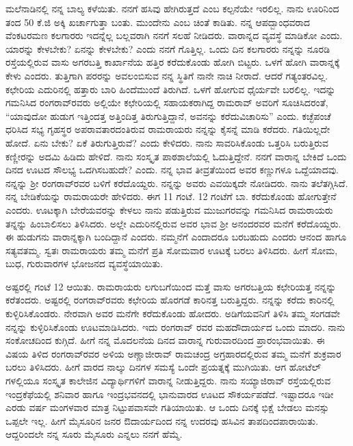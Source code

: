 {ಮಲೆನಾಡಿನಲ್ಲಿ ನನ್ನ ಬಾಲ್ಯ ಕಳೆಯಿತು.  ನನಗೆ ಹಸಿವು ಹೇಗಿರುತ್ತದೆ ಎಂಬ ಕಲ್ಪನೆಯೇ ಇರಲಿಲ್ಲ.  ನಾನು ಊರಿನಿಂದ  ತಂದ 50 ಕೆ.ಜಿ ಅಕ್ಕಿ ಖರ್ಚಾಗುತ್ತಾ ಬಂತು.  ಮುಂದೇನು ಎಂಬ ಚಿಂತೆ ಕಾಡಿತು.  ನನ್ನ ಆಪದ್ಬಾಂಧವರಾದ ವೆಂಕಟರಮಣ ಕಲ\-ಗಾರರು ಇದನ್ನೆಲ್ಲ ಬಲ್ಲವರಾಗಿ ನನಗೆ ಸಲಹೆ ನೀಡಿದರು.  ವಾರಾನ್ನದ ವ್ಯವಸ್ಥೆ ಮಾಡಿಕೋ ಎಂದು.  ಯಾರನ್ನು ಕೇಳಬೇಕು? ಏನನ್ನು ಕೇಳಬೇಕು? ಎಂದು ನನಗೆ ಗೊತ್ತಿಲ್ಲ.  ಒಂದು ದಿನ ಕಲಗಾರರು ನನ್ನನ್ನು ನೂರಡಿ ರಸ್ತೆಯಲ್ಲಿರುವ ವಾಸು ಅಗರಬತ್ತಿ ಕಾರ್ಖಾನೆಯ ಹತ್ತಿರ ಕರೆದುಕೊಂಡು ಹೋಗಿ ಬಿಟ್ಟರು.  ಒಳಗೆ ಹೋಗಿ ವಾರಾನ್ನಕ್ಕೆ ಕೇಳು ಎಂದರು.  ತುತ್ತಿಗಾಗಿ ಪರರನ್ನು ಅವಲಂಬಿಸುವ ನನ್ನ ಸ್ಥಿತಿಗೆ ನಾನೇ ನಾಚಿ ನೀರಾದೆ.  ಆದರೆ ಗತ್ಯಂತರವಿಲ್ಲ.  ಕಛೇರಿಯ ಎದುರಿನಲ್ಲಿ ಹತ್ತಾರು ಬಾರಿ ಹಿಂದೆಮುಂದೆ \hbox{ತಿರುಗಿದೆ.}  ಒಳಗೆ ಹೋಗುವ ಧೈರ್ಯವೇ ಬರಲಿಲ್ಲ.  ಇದನ್ನು ಗಮನಿಸಿದ ರಂಗರಾವ್‍ರವರು ಅಲ್ಲಿಯೇ ಕಛೇರಿಯಲ್ಲಿ ಸಹಾಯಕರಾಗಿದ್ದ ರಾಮರಾವ್ ಅವರಿಗೆ ಸೂಚಿಸಿದರಂತೆ,  “ಯಾವುದೋ ಹುಡುಗ ಇತ್ತಿಂದತ್ತ ಅತ್ತಿಂದಿತ್ತ  ತಿರುಗುತ್ತಿದ್ದಾನೆ, ಅವನನ್ನು ಕರೆದು\break ವಿಚಾರಿಸು” ಎಂದು.  ಕಚ್ಛೆಪಂಚೆ ಧರಿಸಿದ ಸಭ್ಯ ಗೃಹಸ್ಥರ ಅಪರಾವತಾರದಂತಿರುವ ರಾಮರಾಯರು ನನ್ನನ್ನು ಕೈಸನ್ನೆ ಮಾಡಿ ಕರೆದರು.  ಗತಿಯಿಲ್ಲದೇ ಹೋದೆ. ಏನು ಬೇಕು? ಏಕೆ ತಿರುಗುತ್ತಿರುವೆ? ಎಂದು ಕೇಳಿದರು.  ನಾನು ಸಾವರಿಸಿಕೊಂಡು ಒತ್ತರಿಸಿ ಬರುತ್ತಿರುವ ಕಣ್ಣೀರನ್ನು ಅದಮಿ ಹಿಡಿದು ಹೇಳಿದೆ.  ನಾನು ಸಂಸ್ಕೃತ ಪಾಠಶಾಲೆಯಲ್ಲಿ ಓದುತ್ತಿದ್ದೇನೆ. ನನಗೆ ವಾರಾನ್ನ ಬೇಕಿದೆ ಒಂದು ದಿನದ ಊಟದ ಸೌಲಭ್ಯ ಒದಗಿಸಬಹುದೇ? ಎಂದು.  ನನ್ನ ಭಾವ ತೀವ್ರತೆಯಿಂದ ಅವರ ಕಣ್ಣುಗಳೂ ಒದ್ದೆಯಾದವು.  ನನ್ನನ್ನು ಶ್ರೀ ರಂಗರಾವ್‍ರವರ ಬಳಿಗೆ ಕರೆದೊಯ್ದರು.  ನನ್ನನ್ನು ಅವರು ಎವಯಿಕ್ಕದೇ ನೋಡಿದರು.  ನಾನು ತಲೆತಗ್ಗಿಸಿದೆ.  ನನ್ನ ಬೇಡಿಕೆಯನ್ನು ರಾಮರಾಯರೇ ಹೇಳಿದರು.  ಈಗ 11 ಗಂಟೆ. 12 ಗಂಟೆಗೆ ಬಾ. ಕರೆದುಕೊಂಡು ಹೋಗುತ್ತೇನೆ ಎಂದರು.  ಊಟಕ್ಕಾಗಿ ಬೇರೆಯವರನ್ನು ಕೇಳಲು ನಾನು ಪಡುತ್ತಿರುವ ಮುಜುಗರವನ್ನು ಗಮನಿಸಿದ ರಾಮರಾಯರು ತನ್ನನ್ನು ಹಿಂಬಾಲಿಸಲು ತಿಳಿಸಿದರು.  ಅಲ್ಲೇ ಎದುರಿನಲ್ಲಿರುವ ಅವರ ಭಾವ ಶ್ರೀ ಅನಂದರವರ ಮನೆಗೆ ಕರೆದೊಯ್ದರು.  ಈ ಹುಡುಗನು ವಾರಾನ್ನಕ್ಕಾಗಿ ಬಂದಿದ್ದಾನೆ ಎಂದರು. ನಮ್ಮನೆಗೆ ಎಂದಾದರೂ ಬರಬಹುದು ಎಂದರು ಆನಂದ ಹಾಗೂ \hbox{ಸತ್ಯವತಮ್ಮ.} ಸ್ವತಃ ರಾಮರಾಯರು ತಮ್ಮ ಮನೆಗೆ ಪ್ರತಿ ಸೋಮವಾರ ಊಟಕ್ಕೆ ಬರಲು ತಿಳಿಸಿದರು.  ಹೀಗೆ ಸೋಮ, ಬುಧ, ಗುರುವಾರಗಳ ಭೋಜನದ ವ್ಯವಸ್ಥೆಯಾಯಿತು. 

ಅಷ್ಟರಲ್ಲಿ ಗಂಟೆ 12 ಆಯಿತು.  ರಾಮರಾಯರು ಲಗುಬಗೆಯಿಂದ ಮತ್ತೆ ವಾಸು ಅಗರಬತ್ತಿಯ ಕಛೇರಿಯತ್ತ ನನ್ನನ್ನು ಕರೆತಂದರು.  ಅಷ್ಟರಲ್ಲಿ ರಂಗರಾವ್‍ರವರು \hbox{ಕಛೇರಿಯ} ಹೊರಗಡೆ ಕಾರಿನತ್ತ ಬರುತ್ತಿದ್ದರು.  ನನ್ನನ್ನು ಕರೆದು ಕಾರಿನಲ್ಲಿ ಕುಳ್ಳಿರಿಸಿ\-ಕೊಂಡರು.  ನೇರವಾಗಿ ಅವರ ಮನೆಗೇ ಕರೆದುಕೊಂಡು ಹೋದರು.  ಅಡಿಗೆಯವನಿಗೆ ತಿಳಿಸಿ ತಮ್ಮ ಸಂಗಡವೇ ನನ್ನನ್ನು ಕುಳ್ಳಿರಿಸಿ\-ಕೊಂಡು ಊಟಮಾಡಿಸಿದರು.  ಇದು ರಂಗರಾವ್ ರವರ ಮಹದೌದಾರ್ಯದ ಒಂದು ಮಾದರಿ.  ನಾನು ಸಂಕೋಚದಿಂದ ಕುಗ್ಗಿದೆ.  ಹೀಗೆ ನನ್ನ ಮೊದಲನೆಯ ದಿನದ ವಾರಾನ್ನ ಗುರುವಾರದಿಂದ ಪ್ರಾರಂಭವಾಯಿತು. ಈ ವಿಷಯ ತಿಳಿದ ರಂಗರಾವ್‍ರವರ ಅಳಿಯ ಅಣ್ಣಾಜೀರಾವ್ ರಾಮಚಂದ್ರ ಅಗ್ರಹಾರದಲ್ಲಿರುವ ತಮ್ಮ ಮನೆಗೆ ಶುಕ್ರವಾರ ಬರಲು ತಿಳಿಸಿದರು.  ಹೀಗೆ ವಾರದ ನಾಲ್ಕು ದಿನಗಳ ಸಮಸ್ಯೆ ಒಂದೇ ಪ್ರಯತ್ನಕ್ಕೆ ಮುಗಿಯಿತು.  ಆಗ ಹೋಟೆಲ್ ಗಳಲ್ಲಿಯೂ ಸಂಸ್ಕೃತ ಕಾಲೇಜಿನ ವಿದ್ಯಾರ್ಥಿಗಳಿಗೆ ವಾರಾನ್ನ ನೀಡುತ್ತಿದ್ದರು.  ನಾನು ಸಯ್ಯಾಜಿರಾವ್ \hbox{ರಸ್ತೆಯಲ್ಲಿರುವ} ಇಂದ್ರಕೆಫೆಯಲ್ಲಿ ಶನಿವಾರ ಹಾಗೂ ಇಂದ್ರಭವನದಲ್ಲಿ ಭಾನುವಾರದ ಊಟದ ಸೌಕರ್ಯ\-ಪಡೆದೆ.  ಇಷ್ಟಾದರೂ ಇಡೀ ಎರಡು ವರ್ಷ ಮಂಗಳವಾರ ಮಾತ್ರ ನಿಟ್ಟುಪವಾಸವೇ ಗತಿಯಾಯಿತು.  ಆ ಒಂದು ದಿನಕ್ಕೆ ಭಿಕ್ಷೆ ಬೇಡಲು ಮನಸ್ಸು ಒಪ್ಪಲೇ ಇಲ್ಲ.  ಹೀಗೆ ಮೈಸೂರಿನ ಜನರ ಔದಾರ್ಯದಿಂದ ನನ್ನ ಉದರವು ಹಸಿವಿನ ತಾಪದಿಂದ\break  ಪಾರಾಯಿತು.  ಆದ್ದರಿಂದಲೇ ನನ್ನ ಸೂರು ಮೈಸೂರು ಎನ್ನಲು ನನಗೆ ಹೆಮ್ಮೆ.

}
